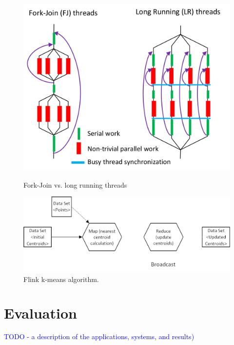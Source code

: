 \documentclass[10pt, conference, compsocconf]{IEEEtran}
\begin{document}
\begin{figure}[!htb]
    \centering
    \begin{minipage}{.49\textwidth}
        \centering        
        \includegraphics[width=0.6\columnwidth]{images/fig_fj_vs_lrt}
        \caption{Fork-Join vs. long running threads}
        \label{fig:fig_fj_vs_lrt}
    \end{minipage}
    \hspace{1.4mm}
    \begin{minipage}{0.49\textwidth}
        \centering
        \includegraphics[width=0.9\columnwidth]{images/fig_kmeans_dataflow}
        \caption{Flink k-means algorithm.}
        \label{fig:fig_flink_kmeans}
    \end{minipage}   
\end{figure}


\section{Evaluation} \label{sec:evaluation}
\textcolor{blue}{TODO - a description of the applications, systems, and results)}
\end{document}
